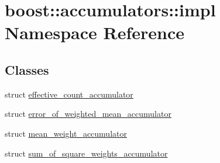 \hypertarget{namespaceboost_1_1accumulators_1_1impl}{}\section{boost\+:\+:accumulators\+:\+:impl Namespace Reference}
\label{namespaceboost_1_1accumulators_1_1impl}
\subsection*{Classes}
\begin{DoxyCompactItemize}
\item 
struct \hyperlink{structboost_1_1accumulators_1_1impl_1_1effective__count__accumulator}{effective\+\_\+count\+\_\+accumulator}
\item 
struct \hyperlink{structboost_1_1accumulators_1_1impl_1_1error__of__weighted__mean__accumulator}{error\+\_\+of\+\_\+weighted\+\_\+mean\+\_\+accumulator}
\item 
struct \hyperlink{structboost_1_1accumulators_1_1impl_1_1mean__weight__accumulator}{mean\+\_\+weight\+\_\+accumulator}
\item 
struct \hyperlink{structboost_1_1accumulators_1_1impl_1_1sum__of__square__weights__accumulator}{sum\+\_\+of\+\_\+square\+\_\+weights\+\_\+accumulator}
\end{DoxyCompactItemize}
